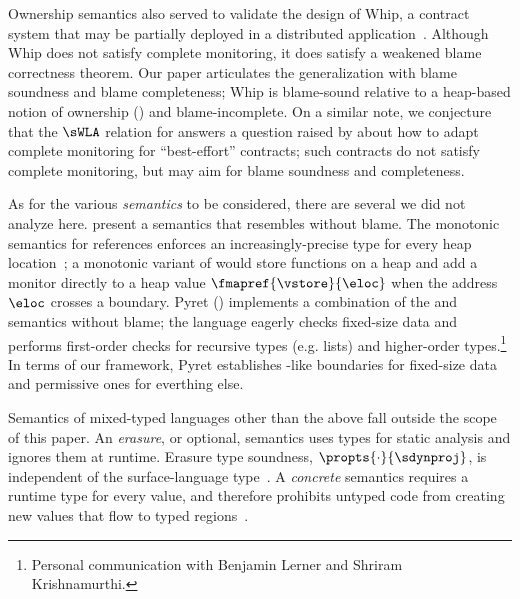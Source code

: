 Ownership semantics also served to validate the design of Whip, a contract
system that may be partially deployed in a distributed
application~\cite{wcd-icfp-2017}.
Although Whip does not satisfy complete monitoring, it does satisfy a weakened
blame correctness theorem.
Our paper articulates the generalization with blame soundness and
blame completeness; Whip is blame-sound relative to a heap-based notion of
ownership () and blame-incomplete.  On a similar note, we
conjecture that the $\sWLA$ relation for \Aname{} answers a
question raised by \citet{sst-jfp-2018} about how to adapt complete monitoring
for ``best-effort'' contracts; such contracts do not satisfy complete monitoring,
but may aim for blame soundness and completeness.

As for the various {\em semantics\/} to be considered, there are several we
 did not analyze here.
 present a semantics that resembles \Aname{} without blame.
The monotonic semantics for references enforces an increasingly-precise
type for every heap location~\cite{svctg-esop-2015}; a monotonic variant of \Nname{}
would store functions on a heap and add a monitor directly to a heap
value $\fmapref{\vstore}{\eloc}$ when the address $\eloc$ crosses a boundary.
Pyret () implements a combination of the
 \Nname{} and \Tname{} semantics without blame; the language eagerly checks
 fixed-size data and performs first-order checks for recursive types
 (e.g. lists) and higher-order types.\footnote{Personal communication with Benjamin Lerner and Shriram
 Krishnamurthi.}  In terms of our framework, Pyret establishes
 \Nname{}-like boundaries for fixed-size data and permissive ones for
 everthing else. 

Semantics of mixed-typed languages other than the above
 fall outside the scope of this paper.  An \emph{erasure\/}, or optional,
 semantics uses types for static analysis and ignores them at runtime.
 Erasure type soundness, $\propts{\cdot}{\sdynproj}$, is independent of the
 surface-language
 type~\cite{bat-ecoop-2014,mmi-dls-2015,bdt-esop-2016,cvgrl-oopsla-2017}.
 A \emph{concrete\/} semantics requires a runtime type for every value, and
 therefore prohibits untyped code from creating new values that flow to
 typed regions~\cite{wnlov-popl-2010, rsfbv-popl-2015, mt-oopsla-2017,
 rzv-ecoop-2015, rat-oopsla-2017}.
